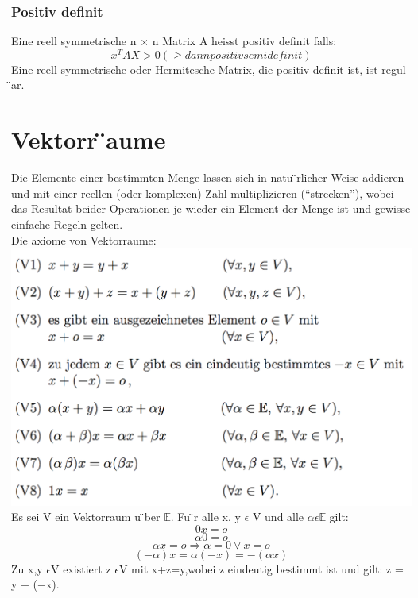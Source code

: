 \documentclass[11pt]{article}
\newcommand\back[1][-3cm]{\hspace*{#1}}
\begin{document}
\subsubsection{Positiv definit}
Eine reell symmetrische n × n Matrix A heisst positiv definit falls:
\begin{equation}
	x^TAX > 0 (\ge dann positiv semidefinit)
\end{equation}
Eine reell symmetrische oder Hermitesche Matrix, die positiv definit ist, ist regul ̈ar.
\section{Vektorr ̈aume}
Die Elemente einer bestimmten Menge lassen sich in natu ̈rlicher Weise addieren und mit einer reellen (oder komplexen) Zahl multiplizieren (“strecken”), wobei das Resultat beider Operationen je wieder ein Element der Menge ist und gewisse einfache Regeln gelten.\\Die axiome von Vektorraume:\\
\back\includegraphics{images/verktorraum}\\
Es sei V ein Vektorraum u ̈ber $\mathbb{E}$. Fu ̈r alle x, y $\epsilon$ V und alle $\alpha \epsilon \mathbb{E}$ gilt:
\begin{equation}
	0x=o
\end{equation}
\begin{equation}
	\alpha 0=o
\end{equation}
\begin{equation}
	\alpha x = o \Rightarrow \alpha = 0 \vee x = o
\end{equation}
\begin{equation}
	(-\alpha)x=\alpha(-x)=-(\alpha x)
\end{equation}
Zu x,y $\epsilon$V existiert z $\epsilon$V mit x+z=y,wobei z eindeutig bestimmt ist und gilt: z = y + (−x).
\end{document}
